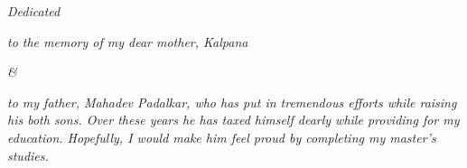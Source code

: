 \newpage
\fchapter[Dedication]{}
\thispagestyle{plain}
\vfil\null
\begin{center}

\mbox{}\vspace{1.5in}

\emph{Dedicated}
\vspace{0.2in}

\emph{to the memory of my dear mother, Kalpana}
\vspace{0.2in}

\emph{\&}

\vspace{0.2in}
\emph{to my father, Mahadev Padalkar, who has put in tremendous efforts while raising his both sons. Over these years he has taxed himself dearly while providing for my education. Hopefully, I would make him feel proud by completing my master's studies.}


\end{center} 
\normalsize
\vfil\null
